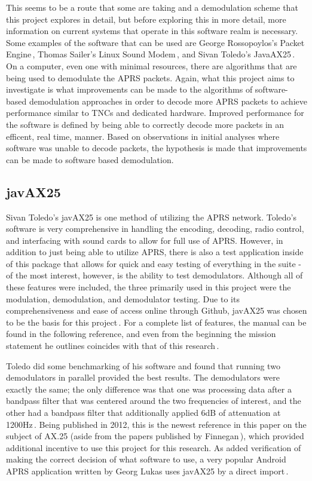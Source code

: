 This seems to be a route that some are taking and a demodulation scheme that this project explores in detail, but before exploring this in more detail, more information on current systems that operate in this software realm is necessary. Some examples of the software that can be used are George Rossopoylos's Packet Engine\,\cite{Rossopoylos}, Thomas Sailer's Linux Sound Modem\,\cite{Sailer1997,Sailer2000}, and Sivan Toledo's JavaAX25\,\cite{javax25github, Toledo2012a}. On a computer, even one with minimal resources, there are algorithms that are being used to demodulate the APRS packets. Again, what this project aims to investigate is what improvements can be made to the algorithms of software-based demodulation approaches in order to decode more APRS packets to achieve performance similar to TNCs and dedicated hardware. Improved performance for the software is defined by being able to correctly decode more packets in an efficent, real time, manner. Based on observations in initial analyses where software was unable to decode packets, the hypothesis is made that improvements can be made to software based demodulation.

\subsection{javAX25}
Sivan Toledo's javAX25 is one method of utilizing the APRS network. Toledo's software is very comprehensive in handling the encoding, decoding, radio control, and interfacing with sound cards to allow for full use of APRS. However, in addition to just being able to utilize APRS, there is also a test application inside of this package that allows for quick and easy testing of everything in the suite - of the most interest, however, is the ability to test demodulators. Although all of these features were included, the three primarily used in this project were the modulation, demodulation, and demodulator testing. Due to its comprehensiveness and ease of access online through Github, javAX25 was chosen to be the basis for this project\,\cite{javax25github}. For a complete list of features, the manual can be found in the following reference, and even from the beginning the mission statement he outlines coincides with that of this research\,\cite{Toledo2012a}.

Toledo did some benchmarking of his software and found that running two demodulators in parallel provided the best results. The demodulators were exactly the same; the only difference was that one was processing data after a bandpass filter that was centered around the two frequencies of interest, and the other had a bandpass filter that additionally applied 6dB of attenuation at 1200Hz\,\cite{Toledo2012}. Being published in 2012, this is the newest reference in this paper on the subject of AX.25 (aside from the papers published by Finnegan\,\cite{KWFThesis, KWFTAPR}), which provided additional incentive to use this project for this research. As added verification of making the correct decision of what software to use, a very popular Android APRS application written by Georg Lukas uses javAX25 by a direct import\,\cite{APRSdroid}.